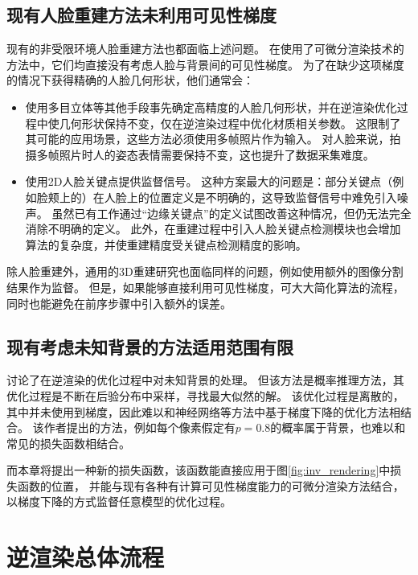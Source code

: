 \subsection{现有人脸重建方法未利用可见性梯度}

现有的非受限环境人脸重建方法也都面临上述问题。
在使用了可微分渲染技术的方法中，它们均直接没有考虑人脸与背景间的可见性梯度。
为了在缺少这项梯度的情况下获得精确的人脸几何形状，他们通常会：
\begin{itemize}
\item 使用多目立体等其他手段事先确定高精度的人脸几何形状，并在逆渲染优化过程中使几何形状保持不变，仅在逆渲染过程中优化材质相关参数\citep{RiviereGBGB20}。
这限制了其可能的应用场景，这些方法必须使用多帧照片作为输入。
对人脸来说，拍摄多帧照片时人的姿态表情需要保持不变，这也提升了数据采集难度。
\item 使用2D人脸关键点提供监督信号\citep{deep3d}。
这种方案最大的问题是：部分关键点（例如脸颊上的）在人脸上的位置定义是不明确的，这导致监督信号中难免引入噪声。
虽然已有工作\citep{qu122015adaptive}通过“边缘关键点”的定义试图改善这种情况，但仍无法完全消除不明确的定义。
此外，在重建过程中引入人脸关键点检测模块也会增加算法的复杂度，并使重建精度受关键点检测精度的影响。
\end{itemize}
除人脸重建外，通用的3D重建研究也面临同样的问题，例如\citet{nvdiffrec}使用额外的图像分割结果作为监督。
但是，如果能够直接利用可见性梯度，可大大简化算法的流程，同时也能避免在前序步骤中引入额外的误差。

\subsection{现有考虑未知背景的方法适用范围有限}

\citet{SchonbornEFV15}讨论了在逆渲染的优化过程中对未知背景的处理。
但该方法是概率推理方法，其优化过程是不断在后验分布中采样，寻找最大似然的解。
该优化过程是离散的，其中并未使用到梯度，因此难以和神经网络等方法中基于梯度下降的优化方法相结合。
该作者提出的方法，例如每个像素假定有$p=0.8$的概率属于背景，也难以和常见的损失函数相结合。

而本章将提出一种新的损失函数，该函数能直接应用于图\ref{fig:inv_rendering}中损失函数的位置，
并能与现有各种有计算可见性梯度能力的可微分渲染方法结合，以梯度下降的方式监督任意模型的优化过程。

\section{逆渲染总体流程}

